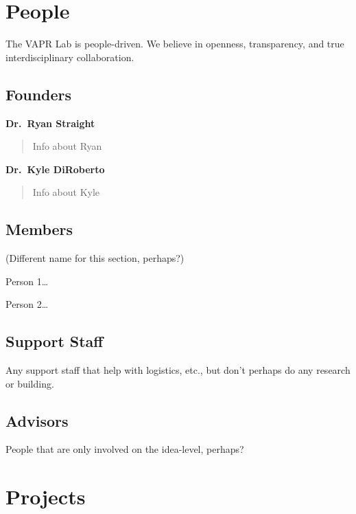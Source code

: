 \documentclass[12pt,]{memoir}
\begin{document}
\hypertarget{people}{%
\chapter{People}\label{people}}

The VAPR Lab is people-driven. We believe in openness, transparency, and true interdisciplinary collaboration.

\hypertarget{founders}{%
\section{Founders}\label{founders}}

\textbf{Dr.~Ryan Straight}

\begin{quote}
Info about Ryan
\end{quote}

\textbf{Dr.~Kyle DiRoberto}

\begin{quote}
Info about Kyle
\end{quote}

\hypertarget{members}{%
\section{Members}\label{members}}

(Different name for this section, perhaps?)

Person 1\ldots{}

Person 2\ldots{}

\hypertarget{support-staff}{%
\section{Support Staff}\label{support-staff}}

Any support staff that help with logistics, etc., but don't perhaps do any research or building.

\hypertarget{advisors}{%
\section{Advisors}\label{advisors}}

People that are only involved on the idea-level, perhaps?

\hypertarget{projects}{%
\chapter{Projects}\label{projects}}
\end{document}
